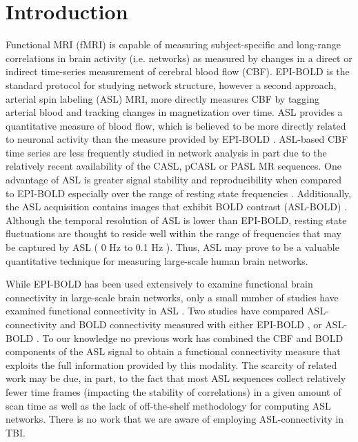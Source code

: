 \documentclass{llncs}
\begin{document}
\section{Introduction}
Functional MRI (fMRI) is capable of measuring subject-specific and long-range correlations in brain activity (i.e. networks) as measured by changes in a direct or indirect time-series measurement of cerebral blood flow (CBF).  EPI-BOLD is the standard protocol for studying network structure, however a second approach, arterial spin labeling (ASL) MRI, more directly measures CBF by tagging arterial blood and tracking changes in magnetization over time. ASL provides a quantitative measure of blood flow, which is believed to be more directly related to neuronal activity than the measure provided by EPI-BOLD \cite{Wong1997}.  ASL-based CBF time series are less frequently studied in network analysis in part due to the relatively recent availability of the CASL, pCASL or PASL MR sequences.  One advantage of ASL is greater signal stability and reproducibility when compared to EPI-BOLD especially over the range of resting state frequencies \cite{Aguirre2002}.  Additionally, the ASL acquisition contains images that exhibit BOLD contrast (ASL-BOLD) \cite{Wong1997}. Although the temporal resolution of ASL is lower than EPI-BOLD, resting state fluctuations are thought to reside well within the range of frequencies that may be captured by ASL ( 0 Hz to 0.1 Hz ).  Thus, ASL may prove to be a valuable quantitative technique for measuring large-scale human brain networks.


While EPI-BOLD has been used extensively to examine functional brain connectivity in large-scale brain networks, only a small number of studies have examined functional connectivity in ASL \cite{Chuang2008,Zou2009}. Two studies have compared ASL-connectivity and BOLD connectivity measured with either EPI-BOLD \cite{Li2012}, or ASL-BOLD \cite{Viviani2011}.  To our knowledge no previous work has combined the CBF and BOLD components of the ASL signal to obtain a functional connectivity measure that exploits the full information provided by this modality. The scarcity of related work may be due, in part, to the fact that most ASL sequences collect relatively fewer time frames (impacting the stability of correlations) in a given amount of scan time as well as the lack of off-the-shelf methodology for computing ASL networks.  There is no work that we are aware of employing ASL-connectivity in TBI.   
\end{document}
